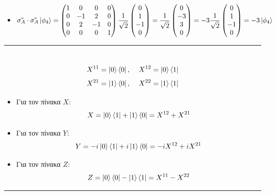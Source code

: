 \documentclass[12pt]{article}
\begin{document}
\begin{itemize}
\item  $$
        \vec{\sigma_A}\cdot\vec{\sigma_A}\ket{\phi_4} = \begin{pmatrix*}
            1 &0& 0& 0\\
            0 &-1 &2& 0 \\ 
            0 &2& -1 &0 \\ 
            0 &0 &0 &1
        \end{pmatrix*} \frac{1}{\sqrt{2}}\begin{pmatrix*}
            0\\1\\-1\\0
        \end{pmatrix*} =\frac{1}{\sqrt{2}}\begin{pmatrix*}
            0\\-3\\3\\0
        \end{pmatrix*} = -3\frac{1}{\sqrt{2}}\begin{pmatrix*}
            0\\1\\-1\\0
        \end{pmatrix*} = -3\ket{\phi_4}
        $$       
    \end{itemize}


    \rule{\textwidth}{.5pt}
    
    \section*{{}}   
    $$ X^{11} = \ket{0}\bra{0},\;\;\;\;X^{12} = \ket{0}\bra{1}$$
    $$ X^{21} = \ket{1}\bra{0},\;\;\;\;X^{22} = \ket{1}\bra{1}$$ 
\begin{itemize}
 \item Για τον πίνακα $X$:
        $$X= \ket{0}\bra{1} + \ket{1}\bra{0}= X^{12} + X^{21}$$

 \item Για τον πίνακα $Y$:
        $$Y= -i\ket{0}\bra{1} + i\ket{1}\bra{0}= -iX^{12} + iX^{21}$$
 \item Για τον πίνακα $Z$:
        $$Z= \ket{0}\bra{0}  -\ket{1}\bra{1}= X^{11}  - X^{22}$$             
\end{itemize}    
\rule{\textwidth}{.5pt}
\end{document}
